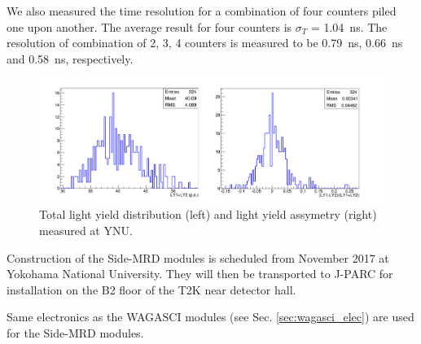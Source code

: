 We also measured the time resolution for a combination of four counters piled one upon another.
The average result for four counters is  $\sigma_T$ = 1.04~ns. %
The resolution of combination of 2, 3, 4 counters is measured to be 0.79~ns, 0.66~ns and 0.58~ns, respectively.
\begin{figure}[tbh]
\begin{center}
\includegraphics[width=0.8\linewidth]{fig/side_mrd_ly.pdf}
\end{center}
\caption{
Total light yield distribution (left) and light yield assymetry (right) measured at YNU.
}
\label{fig:side_mrd_ly}
\end{figure}


Construction of the Side-MRD modules is scheduled from November 2017 
at Yokohama National University. 
They will then be transported to J-PARC for installation on the B2 floor of the T2K near detector hall. 


Same electronics as the WAGASCI modules (see Sec. \ref{sec:wagasci_elec}) are used for the Side-MRD modules.
